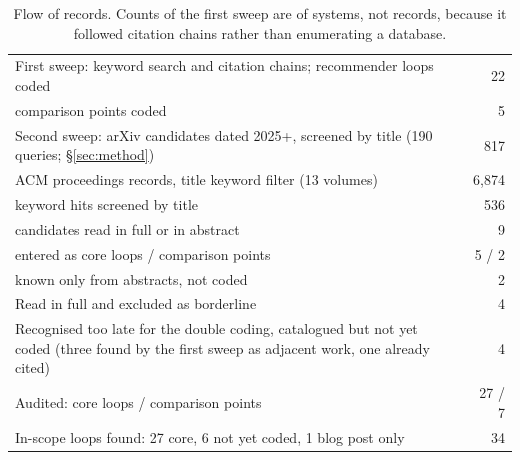 \documentclass[sigconf,nonacm]{acmart}
\begin{document}
\begin{table}[t]
\caption{Flow of records. Counts of the first sweep are of systems, not records, because it followed
citation chains rather than enumerating a database.}\label{tab:flow}
\small
\begin{tabularx}{\columnwidth}{@{}Xr@{}}
\toprule
First sweep: keyword search and citation chains; recommender loops coded & 22 \\
\quad comparison points coded & 5 \\
Second sweep: arXiv candidates dated 2025+, screened by title (190 queries; \S\ref{sec:method}) & 817 \\
\quad ACM proceedings records, title keyword filter (13 volumes) & 6{,}874 \\
\qquad keyword hits screened by title & 536 \\
\quad candidates read in full or in abstract & 9 \\
\quad entered as core loops / comparison points & 5 / 2 \\
\quad known only from abstracts, not coded & 2 \\
Read in full and excluded as borderline & 4 \\
Recognised too late for the double coding, catalogued but not yet coded (three found by the first sweep as adjacent work, one already cited) & 4 \\
\midrule
Audited: core loops / comparison points & 27 / 7 \\
In-scope loops found: 27 core, 6 not yet coded, 1 blog post only & 34 \\
\bottomrule
\end{tabularx}
\end{table}
\end{document}

